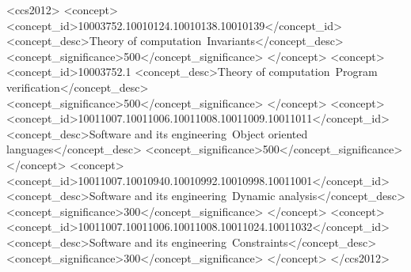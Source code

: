\documentclass[acmsmall,review,anonymous]{acmart}\settopmatter{printfolios=true,printccs=false,printacmref=false}
\begin{document}
\begin{CCSXML}
	<ccs2012>
	<concept>
	<concept_id>10003752.10010124.10010138.10010139</concept_id>
	<concept_desc>Theory of computation~Invariants</concept_desc>
	<concept_significance>500</concept_significance>
	</concept>
	<concept>
	<concept_id>10003752.1
	<concept_desc>Theory of computation~Program verification</concept_desc>
	<concept_significance>500</concept_significance>
	</concept>
	<concept>
	<concept_id>10011007.10011006.10011008.10011009.10011011</concept_id>
	<concept_desc>Software and its engineering~Object oriented languages</concept_desc>
	<concept_significance>500</concept_significance>
	</concept>
	<concept>
	<concept_id>10011007.10010940.10010992.10010998.10011001</concept_id>
	<concept_desc>Software and its engineering~Dynamic analysis</concept_desc>
	<concept_significance>300</concept_significance>
	</concept>
	<concept>
	<concept_id>10011007.10011006.10011008.10011024.10011032</concept_id>
	<concept_desc>Software and its engineering~Constraints</concept_desc>
	<concept_significance>300</concept_significance>
	</concept>
	</ccs2012>
\end{CCSXML}





\maketitle




\end{document}
